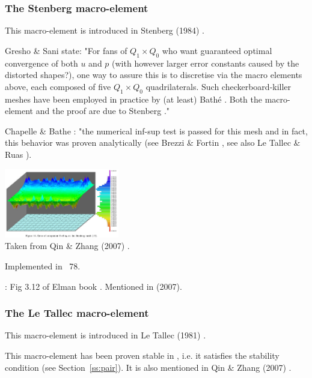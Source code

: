 
\subsubsection{The Stenberg macro-element} 

This macro-element is introduced in Stenberg (1984) \cite{sten84}. 



Gresho \& Sani \cite{grsa} state: "For fans of $Q_1\times Q_0$ who want 
guaranteed optimal convergence of both $u$ and $p$ (with however larger error 
constants caused by the distorted shapes?), one way to assure this is
to discretise via the macro elements above, each composed of five $Q_1\times Q_0$
quadrilaterals. Such checkerboard-killer meshes have been employed in practice
by (at least) Bath\'e \cite{chba93}. Both the macro-element and the proof are
due to Stenberg \cite{sten84}."

Chapelle \& Bathe \cite{chba93}: "the numerical inf-sup test is passed for this mesh and in fact,
this behavior was proven analytically (see Brezzi \& Fortin \cite{brfo}, see 
also Le Tallec \& Ruas \cite{leru86}).

\begin{center}
\includegraphics[width=5cm]{images/meshtopos/qizh07}\\
{\captionfont Taken from Qin \& Zhang (2007) \cite{qizh07}.}
\end{center}

Implemented in \stone~78.

\Literature: Fig 3.12 of Elman \etal book \cite{elsw}. Mentioned in \textcite{qizh07b} (2007).

\subsubsection{The Le Tallec macro-element} 

This macro-element is introduced in Le Tallec (1981) \cite{leta81}.



This macro-element has been proven stable in \cite{leta81,leru86}, i.e. it satisfies 
the stability condition (see Section~\ref{ss:pair}).
It is also mentioned in Qin \& Zhang (2007) \cite{qizh07}.

